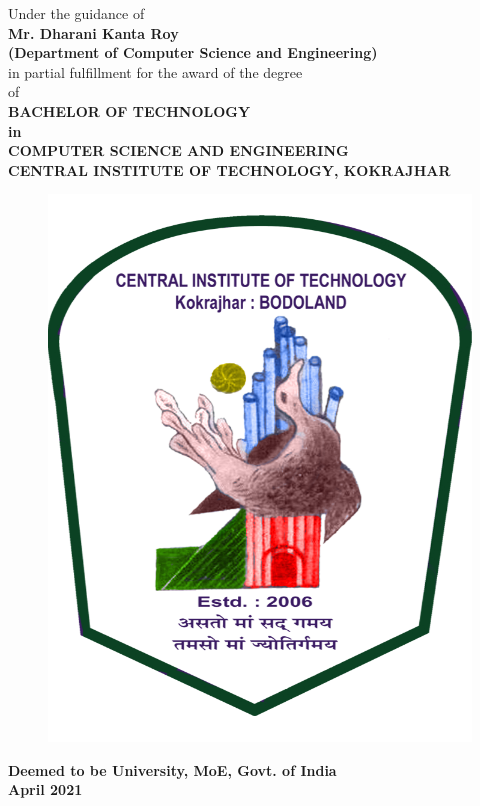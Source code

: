 \documentclass[a4paper,12pt]{article}
\begin{document}
\begin{center}
{			Under the guidance of \\\textbf{Mr. Dharani Kanta Roy}\\\textbf{(Department of Computer Science and Engineering)}\\
			in partial fulfillment for the award of the degree\\
			of\\
			\textbf{BACHELOR OF TECHNOLOGY}\\[\baselineskip]
			\textbf{in}\\[\baselineskip]
			\textbf{COMPUTER SCIENCE AND ENGINEERING}\\
			\textbf{CENTRAL INSTITUTE OF TECHNOLOGY, KOKRAJHAR}\\
			\begin{figure}[h]
				\includegraphics[scale = 0.25]{CIT_Logo.png}
				\centering
			\end{figure}
			\textbf{\small{Deemed to be University, MoE, Govt. of India\\April 2021}}
		}
	\end{center}  
\end{document}
